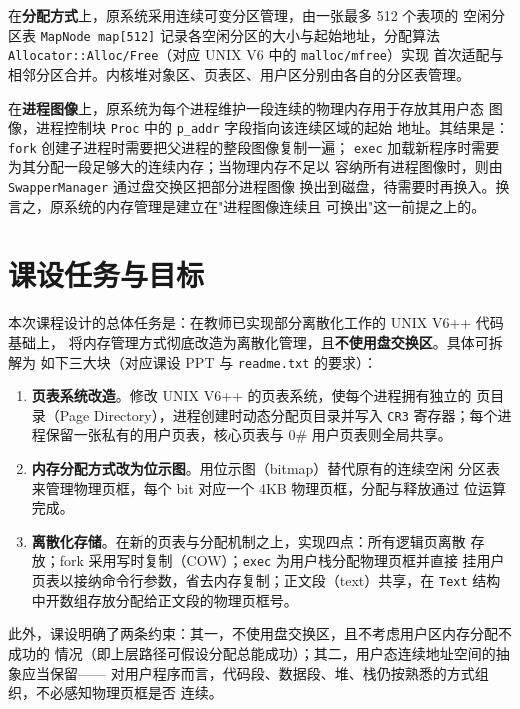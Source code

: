 在\textbf{分配方式}上，原系统采用连续可变分区管理，由一张最多 512 个表项的
空闲分区表 \texttt{MapNode map[512]} 记录各空闲分区的大小与起始地址，分配算法
\texttt{Allocator::Alloc/Free}（对应 UNIX V6 中的 \texttt{malloc/mfree}）实现
首次适配与相邻分区合并。内核堆对象区、页表区、用户区分别由各自的分区表管理。

在\textbf{进程图像}上，原系统为每个进程维护一段连续的物理内存用于存放其用户态
图像，进程控制块 \texttt{Proc} 中的 \texttt{p\_addr} 字段指向该连续区域的起始
地址。其结果是：\texttt{fork} 创建子进程时需要把父进程的整段图像复制一遍；
\texttt{exec} 加载新程序时需要为其分配一段足够大的连续内存；当物理内存不足以
容纳所有进程图像时，则由 \texttt{SwapperManager} 通过盘交换区把部分进程图像
换出到磁盘，待需要时再换入。换言之，原系统的内存管理是建立在"进程图像连续且
可换出"这一前提之上的。

\section{课设任务与目标}
本次课程设计的总体任务是：在教师已实现部分离散化工作的 UNIX V6++ 代码基础上，
将内存管理方式彻底改造为离散化管理，且\textbf{不使用盘交换区}。具体可拆解为
如下三大块（对应课设 PPT 与 \texttt{readme.txt} 的要求）：

\begin{enumerate}[label=（\arabic*）]
  \item \textbf{页表系统改造}。修改 UNIX V6++ 的页表系统，使每个进程拥有独立的
        页目录（Page Directory），进程创建时动态分配页目录并写入 \texttt{CR3}
        寄存器；每个进程保留一张私有的用户页表，核心页表与 0\# 用户页表则全局共享。
  \item \textbf{内存分配方式改为位示图}。用位示图（bitmap）替代原有的连续空闲
        分区表来管理物理页框，每个 bit 对应一个 4KB 物理页框，分配与释放通过
        位运算完成。
  \item \textbf{离散化存储}。在新的页表与分配机制之上，实现四点：所有逻辑页离散
        存放；fork 采用写时复制（COW）；\texttt{exec} 为用户栈分配物理页框并直接
        挂用户页表以接纳命令行参数，省去内存复制；正文段（text）共享，在
        \texttt{Text} 结构中开数组存放分配给正文段的物理页框号。
\end{enumerate}

此外，课设明确了两条约束：其一，不使用盘交换区，且不考虑用户区内存分配不成功的
情况（即上层路径可假设分配总能成功）；其二，用户态连续地址空间的抽象应当保留——
对用户程序而言，代码段、数据段、堆、栈仍按熟悉的方式组织，不必感知物理页框是否
连续。

